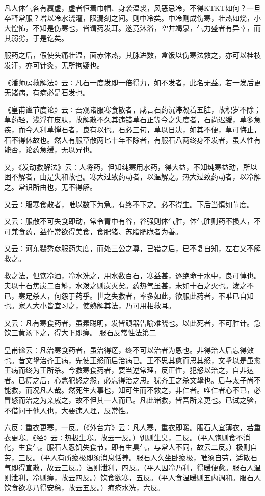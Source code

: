 \documentclass[a4paper,12pt,UTF8,twoside]{ctexbook}
\begin{document}
凡人体气各有羸虚，虚者恒着巾帽、身袭温裘，风恶忌冷，不得KTKT如何？一旦卒释常服？增以冷水浇灌，限漏刻之间。则中冷矣。中冷则成伤寒，壮热如烧，小大惶怖，不知是伤寒也，皆谓药发耳。遂竟沐浴，空井竭泉，气力盛者有异幸，而其弱劣，于是讫矣。

服药之后，假使头痛壮温，面赤体热，其脉进数，盒饭以伤寒法救之，亦可以桂枝发汗，亦可针灸，无所拘疑也。

《潘师房救解法》云∶凡石一度发即一倍得力，如不发者，此名无益。若一发后更无诸病，有病必是石发也。

《皇甫谧节度论》云∶吾观诸服寒食散者，咸言石药沉滞凝着五脏，故积岁不除；草药轻，浅浮在皮肤，故解散不久其违错草石正等今之失度者，石尚迟缓，草多急疾，而今人利草惮石者，良有以也。石必三旬，草以日决，如其不便，草可悔止，石不得休故也。然人有服草散两匕十年不除者，有服石八两终身不发者，虽人性有能否，论药急缓，无以异也。

又，《发动救解法》云∶人将药，但知纯寒用水药，得大益，不知纯寒益动，所以困不解者，由是失和故也。寒大过致药动者，以温解之。热大过致药动者，以冷解之。常识所由也，无不得解。

又云∶服寒食散者，唯以数下为急。有终不下之。必不得生。下后当慎如节度。

又云∶服散不可失食即动，常令胃中有谷，谷强则体气胜，体气胜则药不损人，不可兼食药，益作常欲得美食，食肥猪、苏脂肥脆者为善。

又云∶河东裴秀彦服药失度，而处三公之尊，已错之后，已不复自知，左右又不解救之。

救之法，但饮冷酒，冷水洗之，用水数百石，寒益甚，逐绝命于水中，良可悼也。夫以十石焦炭二百斛，水泼之则炭灭矣。药热气虽甚，未如十石之火也。泼之不已，寒足杀人，何怨于药乎。世之失救者，率多如此，欲服此药者，不唯已自知也。家人大小皆宜习之，使熟解其法，乃可用相救耳。

又云∶凡有寒食药者，虽素聪明，发皆顽器告喻难晓也。以此死者，不可胜计。急饮三黄汤下之，得大下即瘥。
服石反常性法第二

皇甫谧云∶凡治寒食药者，虽治得瘥，终不可以治者为恩也。非得治人后忘得效也。昔文挚治齐王病，先使王怒而后治病已。王不思其愈而思其怒，文挚以是虽愈王病而终为王所杀。今救寒食药者，要当逆常理，反正性，犯怒以治之，自非达者。已瘥之后，心念犯怒之怨，必忘得治之思。犹齐王之杀文挚也。后与太子尚不能救，而况凡人哉。然死生大事也，知可生而不救之，非仁者。唯仁者心不已，必冒怒而治之为亲戚之，故不但其一人而已。凡此诸救，皆吾所亲更也。已试之验，不借问于他人也，大要违人理，反常性。

六反∶重衣更寒，一反。（《外台方》云∶凡人寒，重衣即暖。服石人宜薄衣，若重衣更寒。《经》云∶热极生寒。故云一反。）饥则生臭，二反。（平人饱则食不消化，生食气。服石人忍饥失食节，即有生臭气，与常人不同，故云二反。）极则自劳，三反。（平人有所疲极即须消息恬养。服石人久坐卧疲极，唯须自劳，适散石气即得宣散，故云三反。）温则泄利，四反。（平人因冷乃利，得暖便愈。服石人温则泄利，冷则瘥，故云四反。）饮食欲寒，五反。（平人食温暖则五内调和。服石人饮食欲寒乃得安稳，故云五反。）痈疮水洗，六反。
\end{document}
